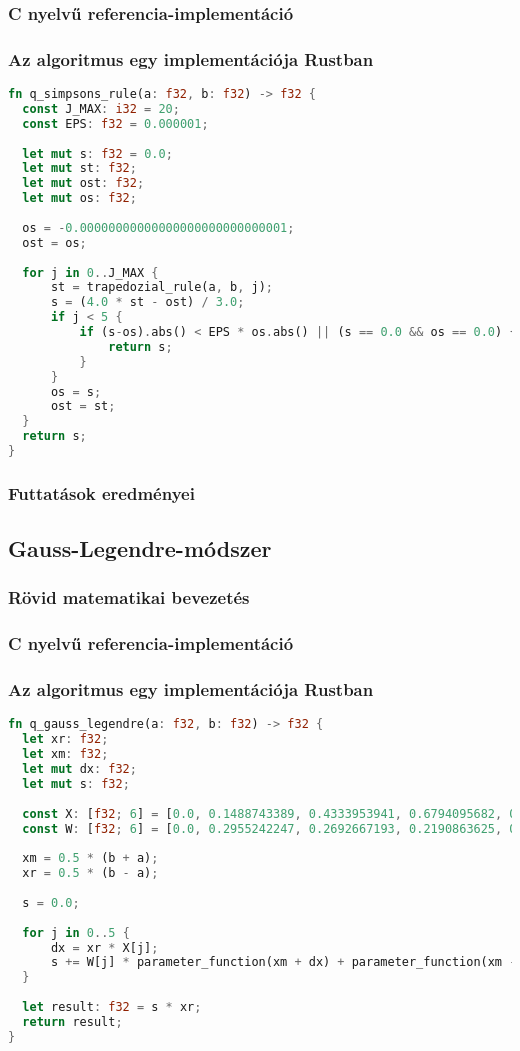 \subsubsection{C nyelvű referencia-implementáció}
\begin{cppstyle}
\end{cppstyle}
\subsubsection{Az algoritmus egy implementációja Rustban}
\begin{lstlisting}[language=Rust]
fn q_simpsons_rule(a: f32, b: f32) -> f32 {
  const J_MAX: i32 = 20;
  const EPS: f32 = 0.000001;
	  
  let mut s: f32 = 0.0;
  let mut st: f32;
  let mut ost: f32;
  let mut os: f32;
  
  os = -0.00000000000000000000000000001;
  ost = os;
  
  for j in 0..J_MAX {
	  st = trapedozial_rule(a, b, j);
	  s = (4.0 * st - ost) / 3.0;
	  if j < 5 {
		  if (s-os).abs() < EPS * os.abs() || (s == 0.0 && os == 0.0) {
			  return s;
		  }
	  }
	  os = s;
	  ost = st;
  }
  return s;
}
\end{lstlisting}
\subsubsection{Futtatások eredményei} %

\subsection{Gauss-Legendre-módszer}
\subsubsection{Rövid matematikai bevezetés}
\subsubsection{C nyelvű referencia-implementáció}
\begin{cppstyle}
\end{cppstyle}
\subsubsection{Az algoritmus egy implementációja Rustban}
\begin{lstlisting}[language=Rust]
fn q_gauss_legendre(a: f32, b: f32) -> f32 {
  let xr: f32;
  let xm: f32;
  let mut dx: f32;
  let mut s: f32;
  
  const X: [f32; 6] = [0.0, 0.1488743389, 0.4333953941, 0.6794095682, 0.8650633666,0.9739065285];
  const W: [f32; 6] = [0.0, 0.2955242247, 0.2692667193, 0.2190863625, 0.1494513491, 0.0666713443];
  
  xm = 0.5 * (b + a);
  xr = 0.5 * (b - a);
  
  s = 0.0;
  
  for j in 0..5 {
	  dx = xr * X[j];
	  s += W[j] * parameter_function(xm + dx) + parameter_function(xm - dx);
  }
  
  let result: f32 = s * xr;
  return result;
}  
\end{lstlisting}
